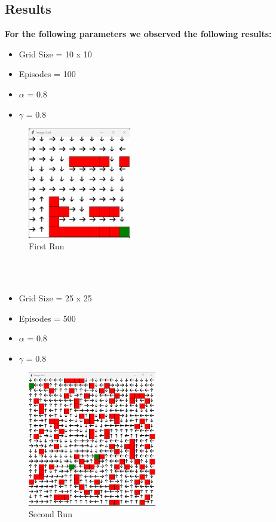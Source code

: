 \documentclass{article}
\begin{document}
\subsection{Results}

\textbf{For the following parameters we observed the following results:}
\begin{itemize}
    \item Grid Size = 10 x 10
    \item Episodes = 100
    \item $\alpha$ = 0.8 
    \item $\gamma$ = 0.8
\end{itemize}

\begin{figure}[H]
  \centering
  \includegraphics[width=0.4\textwidth, height=0.25\textheight]{grid_1.png}
  \caption{First Run}
\end{figure}
\\~\\
\newpage
\begin{itemize}
    \item Grid Size = 25 x 25
    \item Episodes = 500
    \item $\alpha$ = 0.8 
    \item $\gamma$ = 0.8
\end{itemize}

\begin{figure}[H]
  \centering
  \includegraphics[width=0.5\textwidth, height=0.3\textheight]{grid_2.png}
  \caption{Second Run}
\end{figure}
\end{document}
